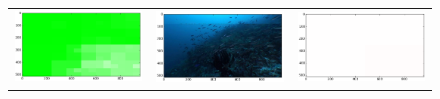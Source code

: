 \begin{figure}[h!tb]
\begin{minipage}{1.3\textwidth}
\begin{tabular}{ccc}
\includegraphics[keepaspectratio=true,width=\segwidth]{images/segment/2737_10__animals__.png} &
\includegraphics[keepaspectratio=true,width=\segwidth]{images/segment/2737_10__image__.png} &
\includegraphics[keepaspectratio=true,width=\segwidth]{images/segment/2737_10__plastic__.png} \\


\end{tabular}
\end{minipage}
\end{figure}
